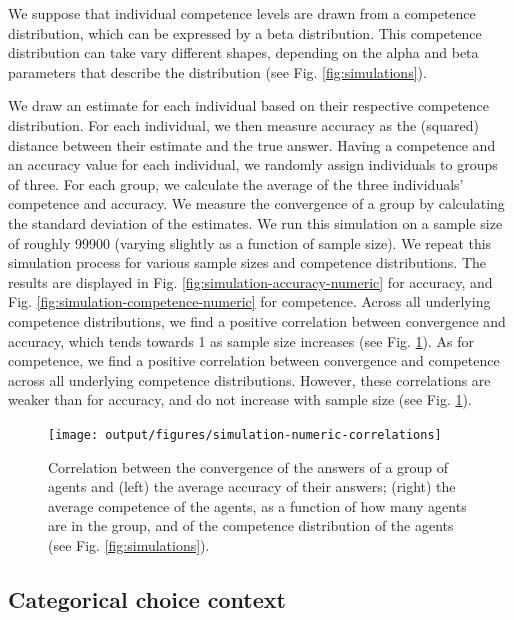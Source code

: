 \documentclass[
  doc,floatsintext]{apa6}
\begin{document}
We suppose that individual competence levels are drawn from a competence distribution, which can be expressed by a beta distribution. This competence distribution can take vary different shapes, depending on the alpha and beta parameters that describe the distribution (see Fig. \ref{fig:simulations}).

We draw an estimate for each individual based on their respective competence distribution. For each individual, we then measure accuracy as the (squared) distance between their estimate and the true answer. Having a competence and an accuracy value for each individual, we randomly assign individuals to groups of three. For each group, we calculate the average of the three individuals' competence and accuracy. We measure the convergence of a group by calculating the standard deviation of the estimates. We run this simulation on a sample size of roughly 99900 (varying slightly as a function of sample size). We repeat this simulation process for various sample sizes and competence distributions. The results are displayed in Fig. \ref{fig:simulation-accuracy-numeric} for accuracy, and Fig. \ref{fig:simulation-competence-numeric} for competence. Across all underlying competence distributions, we find a positive correlation between convergence and accuracy, which tends towards 1 as sample size increases (see Fig. \ref{fig:simulation-numeric-correlations}). As for competence, we find a positive correlation between convergence and competence across all underlying competence distributions. However, these correlations are weaker than for accuracy, and do not increase with sample size (see Fig. \ref{fig:simulation-numeric-correlations}).



\begin{figure}
\texttt{[image: output/figures/simulation-numeric-correlations]} \caption{Correlation between the convergence of the answers of a group of agents and (left) the average accuracy of their answers; (right) the average competence of the agents, as a function of how many agents are in the group, and of the competence distribution of the agents (see Fig. \ref{fig:simulations}).}\label{fig:simulation-numeric-correlations}
\end{figure}

\subsection{Categorical choice context}\label{categorical-choice-context}
\end{document}

